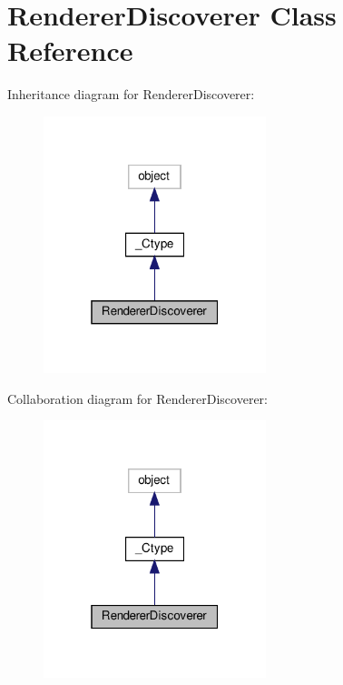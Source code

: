 \hypertarget{classvlc_1_1_renderer_discoverer}{}\section{Renderer\+Discoverer Class Reference}
\label{classvlc_1_1_renderer_discoverer}


Inheritance diagram for Renderer\+Discoverer\+:
\nopagebreak
\begin{figure}[H]
\begin{center}
\leavevmode
\includegraphics[width=184pt]{classvlc_1_1_renderer_discoverer__inherit__graph}
\end{center}
\end{figure}


Collaboration diagram for Renderer\+Discoverer\+:
\nopagebreak
\begin{figure}[H]
\begin{center}
\leavevmode
\includegraphics[width=184pt]{classvlc_1_1_renderer_discoverer__coll__graph}
\end{center}
\end{figure}
